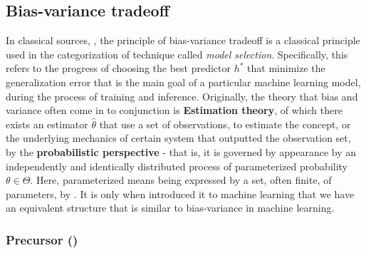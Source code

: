 \documentclass[
  journal=largetwo,
  year=2025,
  volume=37,
]{cup-journal}
\begin{document}
\subsection{Bias-variance tradeoff}

In classical sources, \cite{James2021,goodfellow2016deep,STL_Hajek_Maxim_2021,10.5555/2371238,10.5555/2621980}, the principle of bias-variance tradeoff is a classical principle used in the categorization of technique called \textit{model selection}. Specifically, this refers to the progress of choosing the best predictor $h^{*}$ that minimize the generalization error that is the main goal of a particular machine learning model, during the process of training and inference. Originally, the theory that bias and variance often come in to conjunction is \textbf{Estimation theory}, of which there exists an estimator $\hat{\theta}$ that use a set of observations, to estimate the concept, or the underlying mechanics of certain system that outputted the observation set, by the \textbf{probabilistic perspective} - that is, it is governed by appearance by an independently and identically distributed process of parameterized probability $\theta\in \Theta$. Here, parameterized means being expressed by a set, often finite, of parameters, by \cite{LehmannCasella_theory_1998,liam_statistics_2005}. It is only when \cite{6797087} introduced it to machine learning that we have an equivalent structure that is similar to bias-variance in machine learning. 

\subsubsection{Precursor (\cite{6797087})}
\end{document}

